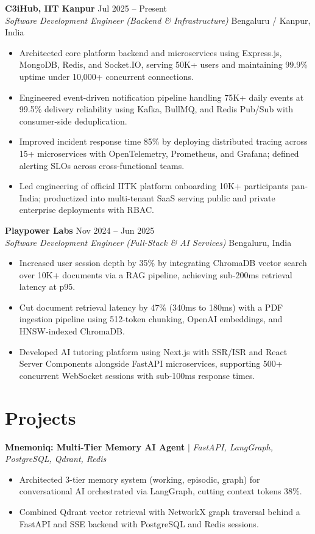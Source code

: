 \documentclass[10pt]{article}
\newcommand{\rItemList}{\begin{itemize}[leftmargin=1.1em, itemsep=0.8pt, topsep=0.8pt, parsep=0pt, label=\textbullet]}
\newcommand{\rEndItemList}{\end{itemize}}
\begin{document}
\textbf{C3iHub, IIT Kanpur} \hfill Jul 2025 -- Present \\
\textit{Software Development Engineer (Backend \& Infrastructure)} \hfill Bengaluru / Kanpur, India
\rItemList
\item Architected core platform backend and microservices using Express.js, MongoDB, Redis, and Socket.IO, serving 50K+ users and maintaining 99.9\% uptime under 10,000+ concurrent connections.
\item Engineered event-driven notification pipeline handling 75K+ daily events at 99.5\% delivery reliability using Kafka, BullMQ, and Redis Pub/Sub with consumer-side deduplication.
\item Improved incident response time 85\% by deploying distributed tracing across 15+ microservices with OpenTelemetry, Prometheus, and Grafana; defined alerting SLOs across cross-functional teams.
\item Led engineering of official IITK platform onboarding 10K+ participants pan-India; productized into multi-tenant SaaS serving public and private enterprise deployments with RBAC.
\rEndItemList

\textbf{Playpower Labs} \hfill Nov 2024 -- Jun 2025 \\
\textit{Software Development Engineer (Full-Stack \& AI Services)} \hfill Bengaluru, India
\rItemList
\item Increased user session depth by 35\% by integrating ChromaDB vector search over 10K+ documents via a RAG pipeline, achieving sub-200ms retrieval latency at p95.
\item Cut document retrieval latency by 47\% (340ms to 180ms) with a PDF ingestion pipeline using 512-token chunking, OpenAI embeddings, and HNSW-indexed ChromaDB.
\item Developed AI tutoring platform using Next.js with SSR/ISR and React Server Components alongside FastAPI microservices, supporting 500+ concurrent WebSocket sessions with sub-100ms response times.
\rEndItemList

\section{Projects}

\textbf{Mnemoniq: Multi-Tier Memory AI Agent} $\vert$ \textit{FastAPI, LangGraph, PostgreSQL, Qdrant, Redis} \\
\rItemList
\item Architected 3-tier memory system (working, episodic, graph) for conversational AI orchestrated via LangGraph, cutting context tokens 38\%.
\item Combined Qdrant vector retrieval with NetworkX graph traversal behind a FastAPI and SSE backend with PostgreSQL and Redis sessions.
\rEndItemList
\end{document}
